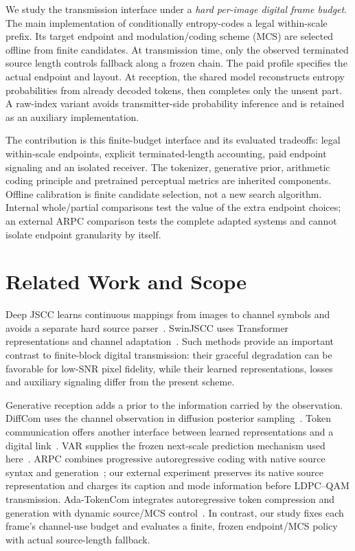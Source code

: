 We study the transmission interface under a \emph{hard per-image digital frame budget}. The main implementation of \nest{} conditionally entropy-codes a legal within-scale prefix. Its target endpoint and modulation/coding scheme (MCS) are selected offline from finite candidates. At transmission time, only the observed terminated source length controls fallback along a frozen chain. The paid profile specifies the actual endpoint and layout. At reception, the shared model reconstructs entropy probabilities from already decoded tokens, then completes only the unsent part. A raw-index variant avoids transmitter-side probability inference and is retained as an auxiliary implementation.

The contribution is this finite-budget interface and its evaluated tradeoffs: legal within-scale endpoints, explicit terminated-length accounting, paid endpoint signaling and an isolated receiver. The tokenizer, generative prior, arithmetic coding principle and pretrained perceptual metrics are inherited components. Offline calibration is finite candidate selection, not a new search algorithm. Internal whole/partial comparisons test the value of the extra endpoint choices; an external ARPC comparison tests the complete adapted systems and cannot isolate endpoint granularity by itself.

\section{Related Work and Scope}
Deep JSCC learns continuous mappings from images to channel symbols and avoids a separate hard source parser~\cite{bourtsoulatze2019deep}. SwinJSCC uses Transformer representations and channel adaptation~\cite{yang2023swinjscc}. Such methods provide an important contrast to finite-block digital transmission: their graceful degradation can be favorable for low-SNR pixel fidelity, while their learned representations, losses and auxiliary signaling differ from the present scheme.

Generative reception adds a prior to the information carried by the observation. DiffCom uses the channel observation in diffusion posterior sampling~\cite{wang2025diffcom}. Token communication offers another interface between learned representations and a digital link~\cite{qiao2025tokcom}. VAR supplies the frozen next-scale prediction mechanism used here~\cite{tian2024var}. ARPC combines progressive autoregressive coding with native source syntax and generation~\cite{arpc2026}; our external experiment preserves its native source representation and charges its caption and mode information before LDPC--QAM transmission. Ada-TokenCom integrates autoregressive token compression and generation with dynamic source/MCS control~\cite{adatokencom2026}. In contrast, our study fixes each frame's channel-use budget and evaluates a finite, frozen endpoint/MCS policy with actual source-length fallback.

